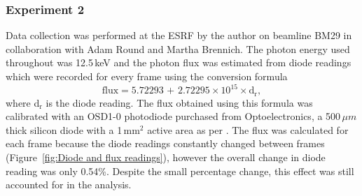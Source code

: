 \subsubsection{Experiment 2}
\label{subs:Experiment 2 - data col}
Data collection was performed at the ESRF by the author on beamline BM29 in collaboration with Adam Round and Martha Brennich.
The photon energy used throughout was 12.5$\,$keV and the photon flux was estimated from diode readings which were recorded for every frame using the conversion formula
\begin{equation}
    \text{flux} = \text{5.72293 + 2.72295} \times \text{10}^{\text{15}} \times \text{d}_{\text{r}},
\end{equation}
where d$_{\text{r}}$ is the diode reading.
The flux obtained using this formula was calibrated with an OSD1-0 photodiode purchased from Optoelectronics, a 500$\,\mu m$ thick silicon diode with a 1$\,$mm$^{\text{2}}$ active area as per \cite{owen2009}.
The flux was calculated for each frame because the diode readings constantly changed between frames (Figure~\ref{fig:Diode and flux readings}), however the overall change in diode reading was only 0.54\%.
Despite the small percentage change, this effect was still accounted for in the analysis.

